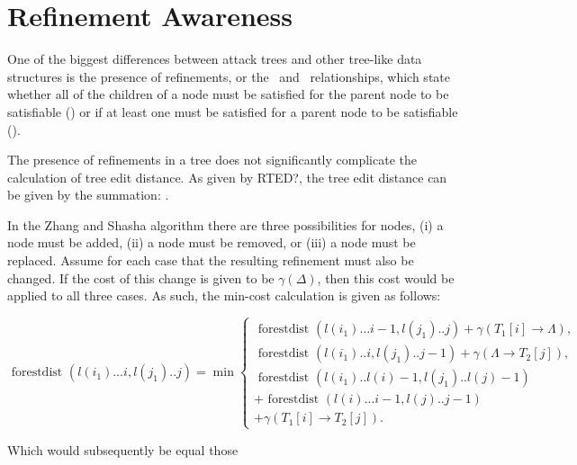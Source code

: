 \section{Refinement Awareness}

One of the biggest differences between attack trees and other tree-like data structures is the presence of refinements, or the \AND\ and \OR\ relationships, which state whether all of the children of a node must be satisfied for the parent node to be satisfiable (\AND) or if at least one must be satisfied for a parent node to be satisfiable (\OR).

The presence of refinements in a tree does not significantly complicate the calculation of tree edit distance. As given by RTED?, the tree edit distance can be given by the summation: .

In the Zhang and Shasha algorithm there are three possibilities for nodes, (i) a node must be added, (ii) a node must be removed, or (iii) a node must be replaced. Assume for each case that the resulting refinement must also be changed. If the cost of this change is given to be $\gamma(\Delta)$, then this cost would be applied to all three cases. As such, the min-cost calculation is given as follows:

\begin{equation*}
    \text { forestdist }\left(l\left(i_1\right) \ldots i, l\left(j_1\right) . . j\right)=\min \left\{\begin{array}{l}
        \text { forestdist }\left(l\left(i_1\right) \ldots i-1, l\left(j_1\right) . . j\right)+\gamma\left(T_1[i] \rightarrow \Lambda\right), \\
        \text { forestdist }\left(l\left(i_1\right) . . i, l\left(j_1\right) . . j-1\right)+\gamma\left(\Lambda \rightarrow T_2[j]\right),    \\
        \text { forestdist }\left(l\left(i_1\right) . . l(i)-1, l\left(j_1\right) . . l(j)-1\right)                                           \\
        + \text { forestdist }(l(i) \ldots i-1, l(j) . . j-1)                                                                                 \\
        +\gamma\left(T_1[i] \rightarrow T_2[j]\right) .
    \end{array}\right.
\end{equation*}

Which would subsequently be equal those

